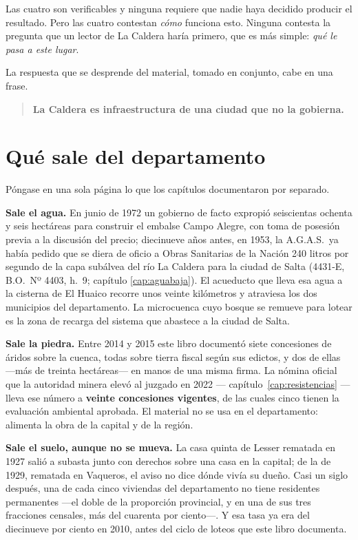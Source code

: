 Las cuatro son verificables y ninguna requiere que nadie haya decidido producir el resultado.
Pero las cuatro contestan \textit{cómo} funciona esto. Ninguna contesta la pregunta que un
lector de La Caldera haría primero, que es más simple: \textit{qué le pasa a este lugar}.

La respuesta que se desprende del material, tomado en conjunto, cabe en una frase.

\begin{quote}
\textbf{La Caldera es infraestructura de una ciudad que no la gobierna.}
\end{quote}

\section{Qué sale del departamento}

Póngase en una sola página lo que los capítulos documentaron por separado.

\textbf{Sale el agua.} En junio de 1972 un gobierno de facto expropió seiscientas ochenta y
seis hectáreas para construir el embalse Campo Alegre, con toma de posesión previa a la
discusión del precio; diecinueve años antes, en 1953, la A.G.A.S.\ ya había pedido que se diera de oficio a Obras Sanitarias de la Nación 240 litros por segundo de la capa subálvea del río La Caldera para la ciudad de Salta (4431-E, B.O.\ Nº 4403, h.\ 9; capítulo \ref{cap:aguabaja}). El acueducto que lleva esa agua a la cisterna de El Huaico recorre
unos veinte kilómetros y atraviesa los dos municipios del departamento. La microcuenca cuyo
bosque se remueve para lotear es la zona de recarga del sistema que abastece a la ciudad de
Salta.

\textbf{Sale la piedra.} Entre 2014 y 2015 este libro documentó siete
concesiones de áridos sobre la cuenca, todas sobre tierra fiscal según sus edictos, y dos de ellas ---más de treinta hectáreas--- en manos de una misma firma. La nómina oficial que la autoridad minera elevó al
juzgado en 2022 --- capítulo~\ref{cap:resistencias} --- lleva ese número a
\textbf{veinte concesiones vigentes}, de las cuales cinco tienen la evaluación ambiental
aprobada. El material no se usa en el departamento: alimenta la obra de la capital y de la
región.

\textbf{Sale el suelo, aunque no se mueva.} La casa quinta de Lesser rematada en 1927
salió a subasta junto con derechos sobre una casa en la capital; de la de 1929, rematada en
Vaqueros, el aviso no dice dónde vivía su dueño. Casi un siglo después,
una de cada cinco viviendas del departamento no tiene residentes permanentes —el doble de
la proporción provincial, y en una de sus tres fracciones censales, más del cuarenta por
ciento—. Y esa tasa ya era del diecinueve por ciento en 2010, antes del ciclo de loteos que
este libro documenta.

